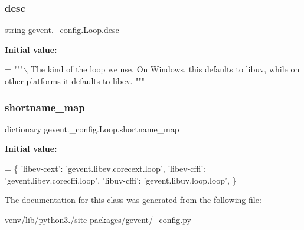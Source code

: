 \subsubsection{\texorpdfstring{desc}{desc}}
{\footnotesize\ttfamily string gevent.\+\_\+config.\+Loop.\+desc\hspace{0.3cm}{\ttfamily [static]}}

{\bfseries Initial value\+:}
\begin{DoxyCode}
=  \textcolor{stringliteral}{"""\(\backslash\)}
\textcolor{stringliteral}{The kind of the loop we use.}
\textcolor{stringliteral}{}
\textcolor{stringliteral}{On Windows, this defaults to libuv, while on}
\textcolor{stringliteral}{other platforms it defaults to libev.}
\textcolor{stringliteral}{}
\textcolor{stringliteral}{"""}
\end{DoxyCode}
\mbox{\label{classgevent_1_1__config_1_1_loop_a04ab8b38285fca2cb3f40c6af15d737e}} 
\subsubsection{\texorpdfstring{shortname\+\_\+map}{shortname\_map}}
{\footnotesize\ttfamily dictionary gevent.\+\_\+config.\+Loop.\+shortname\+\_\+map\hspace{0.3cm}{\ttfamily [static]}}

{\bfseries Initial value\+:}
\begin{DoxyCode}
=  \{
        \textcolor{stringliteral}{'libev-cext'}: \textcolor{stringliteral}{'gevent.libev.corecext.loop'},
        \textcolor{stringliteral}{'libev-cffi'}: \textcolor{stringliteral}{'gevent.libev.corecffi.loop'},
        \textcolor{stringliteral}{'libuv-cffi'}: \textcolor{stringliteral}{'gevent.libuv.loop.loop'},
    \}
\end{DoxyCode}


The documentation for this class was generated from the following file\+:\begin{DoxyCompactItemize}
\item 
venv/lib/python3./site-\/packages/gevent/\+\_\+config.\+py\end{DoxyCompactItemize}
